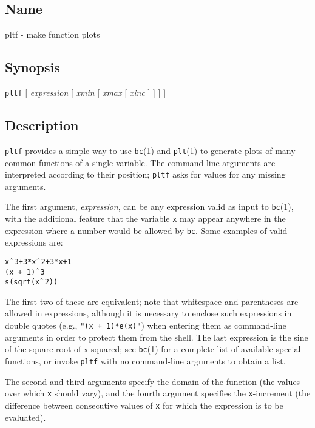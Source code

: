 \subsection*{Name}
pltf - make function plots 
\subsection*{Synopsis}
\texttt{pltf} [ \textit{expression} [ \textit{xmin} [ \textit{xmax} [
\textit{xinc} ] ] ] ] 
\subsection*{Description}


\texttt{pltf} provides a simple way to use \textsf{\texttt{bc}(1)} and \textsf{\texttt{plt}(1)}
to generate plots of many common functions of a single variable.  The command-line
arguments are interpreted according to their position; \texttt{pltf} asks for values
for any missing arguments. 

The first argument, \textit{expression}, can be any expression
valid as input to \textsf{\texttt{bc}(1)}, with the additional feature that the variable
\texttt{x} may appear anywhere in the expression where a number would be allowed
by \texttt{bc}. Some examples of valid expressions are: \begin{description}
\item [\texttt{x$\char94{}$3+3*x$\char94{}$2+3*x+1} ] 
\item [\texttt{(x + 1)$\char94{}$3} ] 
\item [\texttt{s(sqrt(x$\char94{}$2))}
] 
\end{description}


The first two of these are equivalent;  note that whitespace and parentheses
are allowed in expressions, although it is necessary to enclose such expressions
in double quotes (e.g., \texttt{"(x + 1)*e(x)"}) when entering them as command-line
arguments in order to protect them from the shell.  The last expression
is the sine of the square root of x squared;  see \textsf{\texttt{bc}(1)} for a complete
list of available special functions, or invoke \texttt{pltf} with no command-line
arguments to obtain a list. 

The second and third arguments specify the domain
of the function (the values over which \texttt{x} should vary), and the fourth argument
specifies the \texttt{x}-increment (the difference between consecutive values of
\texttt{x} for which the expression is to be evaluated). 

